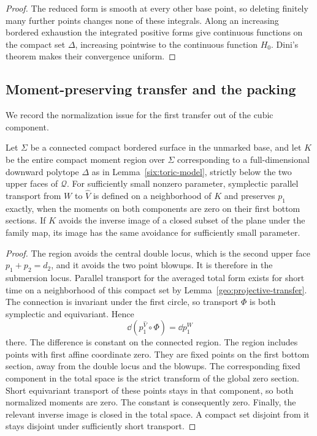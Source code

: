 \begin{proof}
The reduced form is smooth at every other base point, so
deleting finitely many further points changes none of these
integrals.  Along an increasing bordered exhaustion the
integrated positive forms give continuous functions on
the compact set \(\Delta\), increasing pointwise to the
continuous function \(H_0\).
Dini's theorem makes their convergence uniform.
\end{proof}

\subsection{Moment-preserving transfer and the packing}

We record the normalization issue for the first transfer out
of the cubic component.

\begin{lemma}\label{six:moment-transfer}
Let \(\Sigma\) be a connected compact bordered surface in the unmarked
base, and let \(K\) be the entire compact moment region over \(\Sigma\)
corresponding to a full-dimensional downward polytope \(\Delta\) as
in Lemma~\ref{six:toric-model}, strictly below the two upper faces
of \(\mathcal Q\).
For sufficiently small nonzero parameter, symplectic
parallel transport from \(W\) to \(\widehat V\) is defined
on a neighborhood of \(K\) and preserves \(p_1\) exactly,
when the moments on both components are zero on their
first bottom sections.
If \(K\) avoids the inverse image of a closed subset of
the plane under the family map, its image has the same
avoidance for sufficiently small parameter.
\end{lemma}

\begin{proof}
The region avoids the central double locus, which is the
second upper face \(p_1+p_2=d_2\), and it avoids the two
point blowups.  It is therefore in the submersion locus.
Parallel transport for the averaged total form exists for
short time on a neighborhood of this compact set by
Lemma~\ref{geo:projective-transfer}.  The connection is invariant
under the first circle, so transport \(\Phi\) is both
symplectic and equivariant.  Hence
\[
 \dd(p_1^{\widehat V}\circ\Phi)=\dd p_1^W
\]
there.  The difference is constant on the connected region.
The region includes points with first affine coordinate
zero.  They are fixed points on the first bottom section,
away from the double locus and the blowups.
The corresponding fixed component in the total space is
the strict transform of the global zero section.
Short equivariant transport of these points stays in that
component, so both normalized moments are zero.  The
constant is consequently zero.
Finally, the relevant inverse image is closed in the total
space.  A compact set disjoint from it stays disjoint under
sufficiently short transport.
\end{proof}


